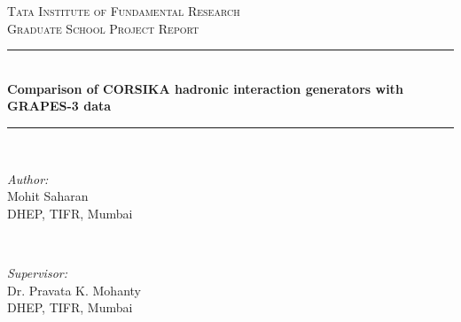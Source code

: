 \documentclass[12pt]{article}
\begin{document}
\begin{titlepage}

\newcommand{\HRule}{\rule{\linewidth}{0.5mm}} %

\center %
 

\textsc{\LARGE Tata Institute of Fundamental Research}\\[1.5cm] 
\textsc{\large Graduate School Project Report}\\[0.5cm] %
\vspace{4cm}

\HRule \\[0.4cm]
{ \huge \bfseries Comparison of CORSIKA hadronic interaction generators with GRAPES-3 data}\\[0.4cm] %
\HRule \\[1.5cm]
 

\vspace{4cm}

\begin{minipage}{0.4\textwidth}
\begin{flushleft} \large
\emph{Author:}\\
Mohit Saharan\\
DHEP, TIFR, Mumbai
\end{flushleft}
\end{minipage}
~
\begin{minipage}{0.4\textwidth}
\begin{flushright} \large
\emph{Supervisor:} \\
Dr. Pravata K. Mohanty\\
DHEP, TIFR, Mumbai
\end{flushright}
\end{minipage}\\[2cm]


\end{titlepage}
\end{document}
